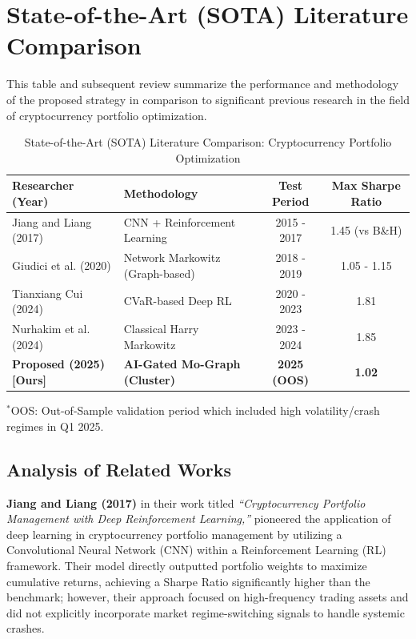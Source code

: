 \documentclass[12pt, a4paper]{article}
\begin{document}
\section*{State-of-the-Art (SOTA) Literature Comparison}

This table and subsequent review summarize the performance and methodology of the proposed strategy in comparison to significant previous research in the field of cryptocurrency portfolio optimization.

\begin{table}[ht!]
\centering
\caption{State-of-the-Art (SOTA) Literature Comparison: Cryptocurrency Portfolio Optimization}
\label{tab:sota_literature}
\begin{tabular}{@{}llcc@{}}
\toprule
\textbf{Researcher (Year)} & \textbf{Methodology} & \textbf{Test Period} & \textbf{Max Sharpe Ratio} \\ \midrule
Jiang and Liang (2017) & CNN + Reinforcement Learning & 2015 - 2017 & 1.45 (vs B\&H) \\
Giudici et al. (2020) & Network Markowitz (Graph-based) & 2018 - 2019 & 1.05 - 1.15 \\
Tianxiang Cui (2024) & CVaR-based Deep RL & 2020 - 2023 & 1.81 \\
Nurhakim et al. (2024) & Classical Harry Markowitz & 2023 - 2024 & 1.85 \\
\textbf{Proposed (2025) [Ours]} & \textbf{AI-Gated Mo-Graph (Cluster)} & \textbf{2025 (OOS)} & \textbf{1.02} \\ \bottomrule
\end{tabular}

\vspace{2mm}
\footnotesize{$^*$OOS: Out-of-Sample validation period which included high volatility/crash regimes in Q1 2025.}
\end{table}

\subsection*{Analysis of Related Works}

\textbf{Jiang and Liang (2017)} in their work titled \textit{``Cryptocurrency Portfolio Management with Deep Reinforcement Learning,''} pioneered the application of deep learning in cryptocurrency portfolio management by utilizing a Convolutional Neural Network (CNN) within a Reinforcement Learning (RL) framework. Their model directly outputted portfolio weights to maximize cumulative returns, achieving a Sharpe Ratio significantly higher than the benchmark; however, their approach focused on high-frequency trading assets and did not explicitly incorporate market regime-switching signals to handle systemic crashes.
\end{document}

